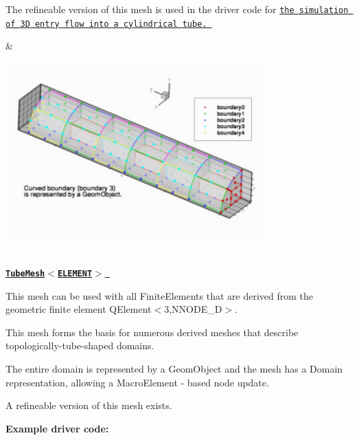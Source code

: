 \begin{center}
\begin{longtabu}
\begin{DoxyItemize}
\item The refineable version of this mesh is used in the driver code for \href{../../../navier_stokes/three_d_entry_flow/html/index.html}{\tt the simulation of 3D entry flow into a cylindrical tube. }
\end{DoxyItemize}& 
\begin{DoxyImageNoCaption}
  \mbox{\includegraphics[width=0.75\textwidth]{quarter_tube_mesh}}
\end{DoxyImageNoCaption}
   \\
\href{classoomph_1_1TubeMesh.html}{\tt {\bfseries  Tube\+Mesh$<$\+E\+L\+E\+M\+E\+N\+T$>$ }} ~\newline
~\newline

\begin{DoxyItemize}
\item This mesh can be used with all {\ttfamily Finite\+Elements} that are derived from the geometric finite element {\ttfamily Q\+Element$<$3,\+N\+N\+O\+D\+E\+\_\+D$>$}.
\item This mesh forms the basis for numerous derived meshes that describe topologically-\/tube-\/shaped domains.
\item The entire domain is represented by a {\ttfamily Geom\+Object} and the mesh has a {\ttfamily Domain} representation, allowing a {\ttfamily Macro\+Element} -\/ based node update.
\item A refineable version of this mesh exists.
\end{DoxyItemize}{\bfseries Example driver code\+:} ~\newline


\end{longtabu}
\end{center}
